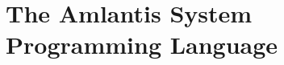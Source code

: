 
\part[The Amlantis System Programming Language]{The Amlantis System \\Programming Language \\ \vspace{1cm} }
\label{part:language-system}

















